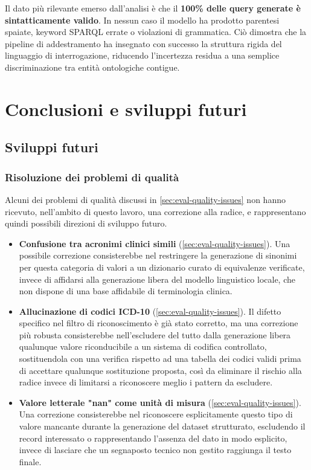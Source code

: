 \documentclass[12pt,a4paper,openright,twoside]{book}
\begin{document}
Il dato più rilevante emerso dall'analisi è che il \textbf{100\% delle query
    generate è sintatticamente valido}. In nessun caso il modello ha prodotto
parentesi spaiate, keyword SPARQL errate o violazioni di grammatica. Ciò
dimostra che la pipeline di addestramento ha insegnato con successo la
struttura rigida del linguaggio di interrogazione, riducendo l'incertezza
residua a una semplice discriminazione tra entità ontologiche contigue.

\chapter{Conclusioni e sviluppi futuri}
\label{chap:conclusion}


\section{Sviluppi futuri}
\label{sec:future-work}

\subsection{Risoluzione dei problemi di qualità}
\label{sec:future-quality-fixes}

Alcuni dei problemi di qualità discussi in \cref{sec:eval-quality-issues} non
hanno ricevuto, nell'ambito di questo lavoro, una correzione alla radice, e
rappresentano quindi possibili direzioni di sviluppo futuro.

\begin{itemize}
    \item \textbf{Confusione tra acronimi clinici simili}
          (\cref{sec:eval-quality-issues}). Una possibile
          correzione consisterebbe nel restringere la generazione di sinonimi per questa
          categoria di valori a un dizionario curato di equivalenze verificate, invece di
          affidarsi alla generazione libera del modello linguistico locale, che non
          dispone di una base affidabile di terminologia clinica.
    \item \textbf{Allucinazione di codici ICD-10}
          (\cref{sec:eval-quality-issues}). Il difetto specifico
          nel filtro di riconoscimento è già stato corretto, ma una correzione più robusta
          consisterebbe nell'escludere del tutto dalla generazione libera qualunque valore
          riconducibile a un sistema di codifica controllato, sostituendola con una
          verifica rispetto ad una tabella dei codici validi prima di accettare qualunque
          sostituzione proposta, così da eliminare il rischio alla radice invece di
          limitarsi a riconoscere meglio i pattern da escludere.
    \item \textbf{Valore letterale "nan" come unità di misura}
          (\cref{sec:eval-quality-issues}). Una correzione
          consisterebbe nel riconoscere esplicitamente questo tipo di valore mancante
          durante la generazione del dataset strutturato, escludendo il record interessato
          o rappresentando l'assenza del dato in modo esplicito, invece di lasciare che un
          segnaposto tecnico non gestito raggiunga il testo finale.
\end{itemize}
\end{document}
